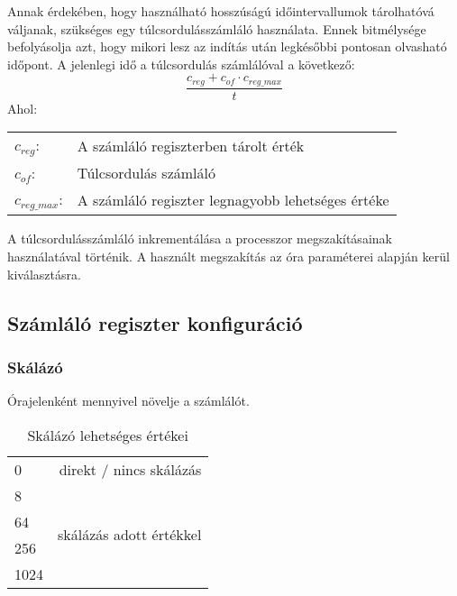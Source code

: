 Annak érdekében, hogy használható hosszúságú időintervallumok tárolhatóvá váljanak, szükséges egy túlcsordulásszámláló használata.
Ennek bitmélysége befolyásolja azt, hogy mikori lesz az indítás után legkésőbbi pontosan olvasható időpont.
A jelenlegi idő a túlcsordulás számlálóval a következő:
\begin{equation}
    \frac{c_{reg} + c_{of} \cdot c_{reg\_max}}{t}
    \label{eq:ido_szamlalokbol}
\end{equation}
Ahol:
\captionsetup[table]{list=no}
\begin{table}[H]
    \begin{tabular}{ll}
    $c_{reg}$:&A számláló regiszterben tárolt érték \\
    $c_{of}$:&Túlcsordulás számláló \\
    $c_{reg\_max}$:&A számláló regiszter legnagyobb lehetséges értéke \\
    \end{tabular}
\end{table}
\captionsetup[table]{list=yes}
A túlcsordulásszámláló inkrementálása a processzor megszakításainak használatával történik.
A használt megszakítás az óra paraméterei alapján kerül kiválasztásra.

\subsection{Számláló regiszter konfiguráció}

\subsubsection{Skálázó} Órajelenként mennyivel növelje a számlálót.
\begin{table}[H]
    \centering
    \begin{tabular}{|lr|}
    \hline
    \rowcolor{lightgray}
    \multicolumn{2}{|c|}{Lehetséges értékek}                              \\ \hline
    \multicolumn{1}{|l|}{0}    & direkt / nincs skálázás                  \\ \hline
    \multicolumn{1}{|l|}{8}    & \multirow{4}{*}{skálázás adott értékkel} \\ \cline{1-1}
    \multicolumn{1}{|l|}{64}   &                                          \\ \cline{1-1}
    \multicolumn{1}{|l|}{256}  &                                          \\ \cline{1-1}
    \multicolumn{1}{|l|}{1024} &                                          \\ \hline
    \end{tabular}
    \caption{Skálázó lehetséges értékei}
    \label{tab:skalazo_ertekek}
\end{table}

